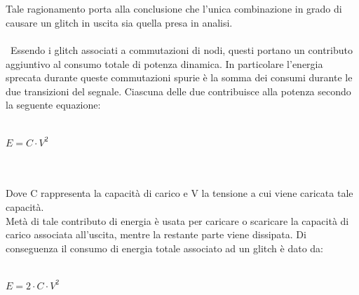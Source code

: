\documentclass[11pt,  english, makeidx, a4paper, titlepage, oneside]{book}
\begin{document}
\\\\
Tale ragionamento porta alla conclusione che l'unica combinazione in grado
di causare un glitch in uscita sia quella presa in analisi.
\\\\\
Essendo i glitch associati a commutazioni di nodi, questi portano un 
contributo aggiuntivo al consumo totale di potenza dinamica. In particolare
l'energia sprecata durante queste commutazioni spurie è la somma dei consumi
durante le due transizioni del segnale. Ciascuna delle due contribuisce alla
potenza secondo la seguente equazione:
\\\\
\centerline{$E = C \cdot V^{2}$}
\\\\
Dove C rappresenta la capacità di carico e V la tensione a cui viene caricata
tale capacità.
\\
Metà di tale contributo di energia è usata per caricare o scaricare la
capacità di carico associata all'uscita, mentre la restante parte viene
dissipata.
Di conseguenza il consumo di energia totale associato ad un glitch è 
dato da:
\\\\
\centerline{$E = 2 \cdot C \cdot V^{2}$}
\\\\
\newpage
\end{document}
